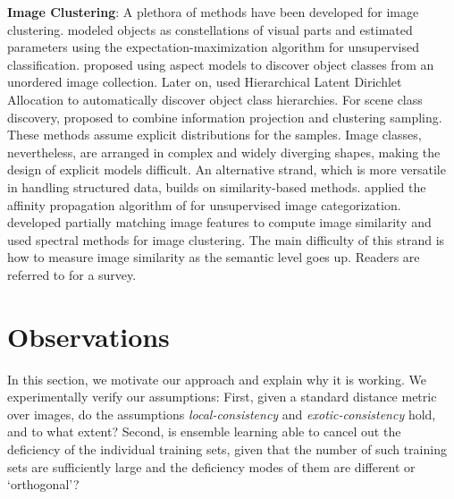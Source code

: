\documentclass[preprint,12pt,3p]{elsarticle}
\begin{document}
\textbf{Image Clustering}: A plethora of methods have been developed for image clustering.  
\citep{Fergus03} modeled
objects as constellations of visual parts and estimated parameters
using the expectation-maximization algorithm for unsupervised
classification. \citep{Sivic05b} proposed using aspect models
to discover object classes from an unordered image
collection. Later on, \citep{Sivic08} used Hierarchical Latent
Dirichlet Allocation to automatically discover object class
hierarchies. For scene class discovery, \citep{dai}
proposed to combine information projection and clustering
sampling. These methods assume explicit distributions for the samples.
Image classes, nevertheless, are arranged in complex
and widely diverging shapes, making the design of explicit models
difficult. %
An alternative strand, which is more versatile in handling structured
data, builds on similarity-based methods. 
\citep{Frey_AffinityPropagation} applied the affinity propagation
algorithm of \citep{Frey_Dueck_2007} for unsupervised image
categorization.  \citep{Grauman06} developed
partially matching image features to compute image similarity and used
spectral methods for image clustering.
The main difficulty of this strand is how to measure image similarity
as the semantic level goes up.  
Readers are referred to \citep{Tuytelaars_UnsupervisedSurvey} for a survey.




\section{Observations}
\label{sec:observations}

\label{sec:observation} In this section, we motivate our approach and explain why it is
working. We experimentally verify our assumptions: First, given a
standard distance metric over images, do the assumptions
\emph{local-con\-sist\-ency} and \emph{exotic-con\-sistency}
hold, and to what extent? Second, is ensemble learning able to cancel
out the deficiency of the individual training sets, given that the
number of such training sets are sufficiently large and the deficiency
modes of them are different or `orthogonal'?
\end{document}

